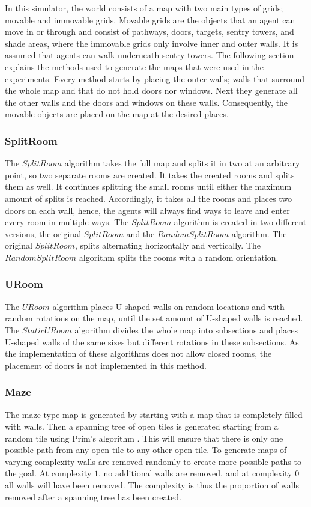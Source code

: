 
In this simulator, the world consists of a map with two main types of grids; movable and immovable grids. Movable grids are the objects that an agent can move in or through and consist of pathways, doors, targets, sentry towers, and shade areas, where the immovable grids only involve inner and outer walls. It is assumed that agents can walk underneath sentry towers. The following section explains the methods used to generate the maps that were used in the experiments.
Every method starts by placing the outer walls; walls that surround the whole map and that do not hold doors nor windows. Next they generate all the other walls and the doors and windows on these walls. Consequently, the movable objects are placed on the map at the desired places.

\subsubsection{SplitRoom}
The $SplitRoom$ algorithm takes the full map and splits it in two at an arbitrary point, so two separate rooms are created. It takes the created rooms and splits them as well. It continues splitting the small rooms until either the maximum amount of splits is reached. Accordingly, it takes all the rooms and places two doors on each wall, hence, the agents will always find ways to leave and enter every room in multiple ways.
The $SplitRoom$ algorithm is created in two different versions, the original $SplitRoom$ and the $RandomSplitRoom$ algorithm. The original $SplitRoom$, splits alternating horizontally and vertically. The $RandomSplitRoom$ algorithm splits the rooms with a random orientation.

\subsubsection{URoom}
The $URoom$ algorithm places U-shaped walls on random locations and with random rotations on the map, until the set amount of U-shaped walls is reached.
The $StaticURoom$ algorithm divides the whole map into subsections and places U-shaped walls of the same sizes but different rotations in these subsections.
As the implementation of these algorithms does not allow closed rooms, the placement of doors is not implemented in this method.

\subsubsection{Maze}
The maze-type map is generated by starting with a map that is completely filled with walls. Then a spanning tree of open tiles is generated starting from a random tile using Prim's algorithm \cite{graham1985history}. This will ensure that there is only one possible path from any open tile to any other open tile. To generate maps of varying complexity walls are removed randomly to create more possible paths to the goal. At complexity $1$, no additional walls are removed, and at complexity $0$ all walls will have been removed. The complexity is thus the proportion of walls removed after a spanning tree has been created.